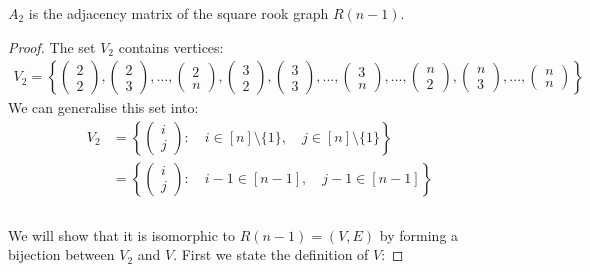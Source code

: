 \begin{proposition}
    $A_2$ is the adjacency matrix of the square rook graph \(R(n-1)\).
\end{proposition}
\begin{proof} The set \(V_2\) contains vertices:
\begin{align*}
    V_2 = \left\{ \begin{pmatrix} 2 \\ 2 \end{pmatrix}, \begin{pmatrix} 2 \\ 3 \end{pmatrix},...,\begin{pmatrix} 2 \\ n \end{pmatrix},\begin{pmatrix} 3 \\ 2 \end{pmatrix}, \begin{pmatrix} 3 \\ 3 \end{pmatrix},...,\begin{pmatrix} 3 \\ n \end{pmatrix},...,\begin{pmatrix} n \\ 2 \end{pmatrix}, \begin{pmatrix} n \\ 3 \end{pmatrix},...,\begin{pmatrix} n \\ n \end{pmatrix} \right \}
\end{align*}
We can generalise this set into:
\begin{align*}
    V_2 &= \left \{ \begin{pmatrix} i \\ j \end{pmatrix}:\quad i \in [n]\setminus\{1\}, \quad j \in [n]\setminus\{1\}\right \} \\
    & = \left \{ \begin{pmatrix} i \\ j \end{pmatrix} :\quad i-1 \in [n-1],\quad j-1 \in [n-1]\right \} \\
\end{align*} \\
We will show that it is isomorphic to $R(n-1) = (V,E)$ by forming a bijection between $V_2$ and $V$. First we state the definition of $V$:

\end{proof}
